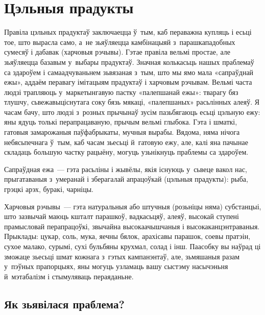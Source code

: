\chapter{Цэльныя прадукты}

Правіла цэльных прадуктаў заключаецца ў~тым, каб пераважна купляць і есьці тое, што вырасла само, а~не зьяўляецца камбінацыяй з~парашкападобных сумесяў і дабавак (харчовыя рэчывы). Гэтае правіла вельмі простае, але зьяўляецца базавым у~выбары прадуктаў. Значная колькасьць нашых праблемаў са здароўем і самаадчуваньнем зьвязаная з~тым, што мы ямо мала «сапраўднай ежы», аддаём перавагу імітацыям прадуктаў і харчовым рэчывам. Вельмі часта людзі трапляюць у~маркетынгавую пастку «палепшанай ежы»: тварагу бяз тлушчу, сьвежавыціснутага соку бязь мякаці, «палепшаных» расьлінных алеяў. Я часам бачу, што людзі з~розных прычынаў зусім пазьбягаюць есьці цэльную ежу: яны ядуць толькі перапрацаваную, прычым вельмі глыбока. Гэта і шматкі, гатовыя замарожаныя паўфабрыкаты, мучныя вырабы. Вядома, няма нічога небясьпечнага ў~тым, каб часам зьесьці й~гатовую ежу, але, калі яна пачынае складаць большую частку рацыёну, могуць узьнікнуць праблемы са здароўем.


Сапраўдная ежа~--- гэта расьліны і жывёлы, якія існуюць у~сьвеце вакол нас, прыгатаваныя з~умеранай і зберагалай апрацоўкай (цэльныя прадукты): рыба, грэцкі арэх, буракі, чарніцы.

Харчовыя рэчывы~--- гэта натуральныя або штучныя (розьніцы няма) субстанцыі, што зазвычай маюць кшталт парашкоў, вадкасьцяў, алеяў, высокай ступені прамысловай перапрацоўкі, звычайна высокаачышчаныя і высокаканцэнтраваныя. Прыклады: цукар, соль, мука, яечны бялок, арахісавы парашок, соевы пратэін, сухое малако, сурымі, сухі бульбяны крухмал, солад і інш. Паасобку вы наўрад ці зможаце зьесьці шмат кожнага з~гэтых кампанэнтаў, але, зьмяшаныя разам у~пэўных прапорцыях, яны могуць узламаць вашу сыстэму насычэньня й~мэтабалізм і стымуляваць пераяданьне.

\section{Як зьявілася праблема?}

